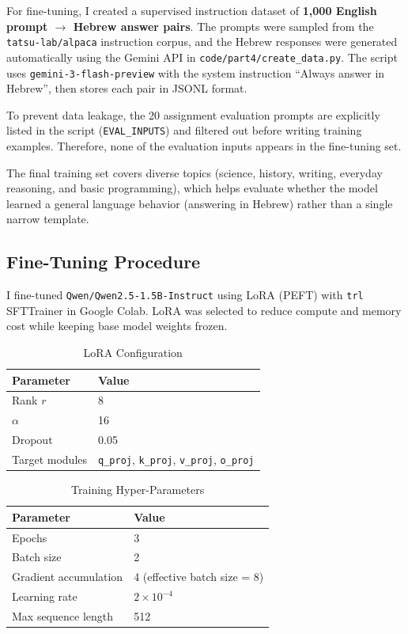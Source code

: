 \documentclass[11pt, a4paper]{article}
\begin{document}
For fine-tuning, I created a supervised instruction dataset of
\textbf{1,000 English prompt $\to$ Hebrew answer pairs}.
The prompts were sampled from the
\texttt{tatsu-lab/alpaca} instruction corpus, and the Hebrew responses were
generated automatically using the Gemini API in
\texttt{code/part4/create\_data.py}.
The script uses \texttt{gemini-3-flash-preview} with the system instruction
``Always answer in Hebrew'', then stores each pair in JSONL format.

To prevent data leakage, the 20 assignment evaluation prompts are explicitly
listed in the script (\texttt{EVAL\_INPUTS}) and filtered out before
writing training examples. Therefore, none of the evaluation inputs appears in
the fine-tuning set.

The final training set covers diverse topics (science, history, writing,
everyday reasoning, and basic programming), which helps evaluate whether the
model learned a general language behavior (answering in Hebrew) rather than a
single narrow template.

\subsection{Fine-Tuning Procedure}

I fine-tuned \texttt{Qwen/Qwen2.5-1.5B-Instruct} using LoRA (PEFT) with
\texttt{trl} SFTTrainer in Google Colab.
LoRA was selected to reduce compute and memory cost while keeping base model
weights frozen.

\begin{table}[H]
\centering
\caption{LoRA Configuration}
\begin{tabular}{L{4cm}L{8.5cm}}
\toprule
Parameter & Value \\
\midrule
Rank $r$ & 8 \\
$\alpha$ & 16 \\
Dropout & 0.05 \\
Target modules & \texttt{q\_proj}, \texttt{k\_proj}, \texttt{v\_proj}, \texttt{o\_proj} \\
\bottomrule
\end{tabular}
\end{table}

\begin{table}[H]
\centering
\caption{Training Hyper-Parameters}
\begin{tabular}{L{4cm}L{8.5cm}}
\toprule
Parameter & Value \\
\midrule
Epochs & 3 \\
Batch size & 2 \\
Gradient accumulation & 4 (effective batch size = 8) \\
Learning rate & $2 \times 10^{-4}$ \\
Max sequence length & 512 \\
\bottomrule
\end{tabular}
\end{table}
\end{document}

